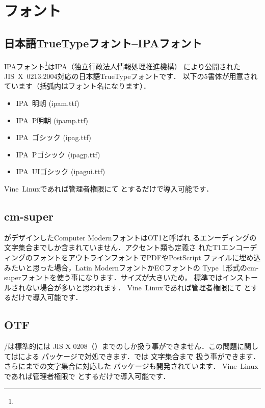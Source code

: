 \section{フォント}

\subsection{日本語TrueTypeフォント--IPAフォント}
IPAフォント\footnote{\webGRASSIPA}はIPA（独立行政法人情報処理推進機構）
により公開されたJIS~X~0213:2004対応の日本語TrueTypeフォントです．
以下の5書体が用意されています（括弧内はフォント名になります）．
\begin{itemize}
 \item IPA~明朝 (ipam.ttf)
 \item IPA~P明朝 (ipamp.ttf)
 \item IPA~ゴシック (ipag.ttf)
 \item IPA~Pゴシック (ipagp.ttf)
 \item IPA~UIゴシック (ipagui.ttf)
\end{itemize}
Vine~Linuxであれば管理者権限にて
とするだけで導入可能です．



\subsection{cm-super}
がデザインしたComputer ModernフォントはOT1と呼ばれ
るエンーディングの文字集合までしか含まれていません．アクセント類も定義さ
れたT1エンコーディングのフォントをアウトラインフォントでPDFやPostScript
ファイルに埋め込みたいと思った場合，Latin ModernフォントかECフォントの
Type~1形式の{cm-super}フォントを使う事になります．サイズが大きいため，
標準ではインストールされない場合が多いと思われます．
Vine~Linuxであれば管理者権限にて
とするだけで導入可能です．

\subsection{OTF}
%
\pTeX/\pLaTeX は標準的には JIS X 0208（）までのしか扱う事ができません．この問題に関してはによる
パッケージで対処できます．では  文字集合まで
扱う事ができます．さらにまでの文字集合に対応した
パッケージも開発されています．
Vine~Linuxであれば管理者権限で
とするだけで導入可能です．

